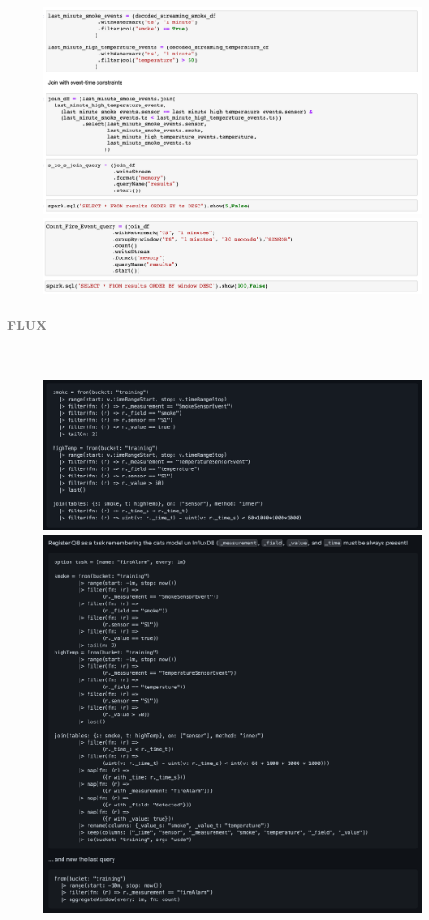 \documentclass[10pt,a4paper]{article}
\newcommand{\myparagraph}[1]{\paragraph{\normalsize{\textcolor{gray}{\uppercase{\textbf{#1}}}} }\mbox{} \vspace{0.5em}\\}
\begin{document}
\begin{figure}[h!]
 \hfill \includegraphics[width=400pt]{images/sss_Q8}\hspace*{\fill}
  \\ \center
   \hfill \includegraphics[width=400pt]{images/sss_Q9}\hspace*{\fill}
\end{figure}
\pagebreak
\myparagraph{Flux}
\begin{figure}[h!]
 \hfill \includegraphics[width=400pt]{images/flux_Q8}\hspace*{\fill}
 \\ \center
  \hfill \includegraphics[width=400pt]{images/flux_Q9}\hspace*{\fill}

\end{figure}
\end{document}
